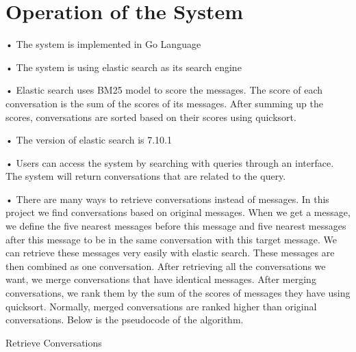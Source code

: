 \section{Operation of the System}

•	The system is implemented in Go Language

•	The system is using elastic search as its search engine

•	Elastic search uses BM25 model to score the messages. The score of each conversation is the sum of the scores of its messages. After summing up the scores, conversations are sorted based on their scores using quicksort.

•	The version of elastic search is 7.10.1

•	Users can access the system by searching with queries through an interface. The system will return conversations that are related to the query.


•	There are many ways to retrieve conversations instead of messages. In this project we find conversations based on original messages. When we get a message, we define the five nearest messages before this message and five nearest messages after this message to be in the same conversation with this target message. We can retrieve these messages very easily with elastic search. These messages are then combined as one conversation. After retrieving all the conversations we want, we merge conversations that have identical messages. After merging conversations, we rank them by the sum of the scores of messages they have using quicksort. Normally, merged conversations are ranked higher than original conversations. Below is the pseudocode of the algorithm.

\begin{algorithm}
	\SetAlgoLined
	\caption{Retrieve Conversations}
\end{algorithm}
		




